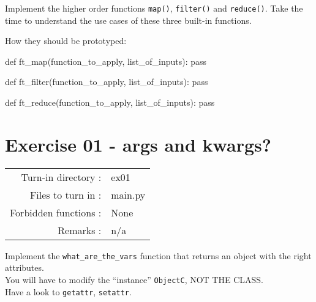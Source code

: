 \documentclass[]{article}
\newenvironment{Shaded}{\begin{snugshade}}{\end{snugshade}}
\newcommand{\ControlFlowTok}[1]{\textcolor[rgb]{0.99,0.74,0.29}{#1}}
\newcommand{\KeywordTok}[1]{\textcolor[rgb]{0.81,0.81,0.76}{#1}}
\newcommand{\NormalTok}[1]{\textcolor[rgb]{0.81,0.81,0.76}{#1}}
\begin{document}
Implement the higher order functions \texttt{map()}, \texttt{filter()}
and \texttt{reduce()}. Take the time to understand the use cases of
these three built-in functions.

How they should be prototyped:

\begin{Shaded}
\begin{Highlighting}[]
\KeywordTok{def}\NormalTok{ ft_map(function_to_apply, list_of_inputs):}
    \ControlFlowTok{pass}

\KeywordTok{def}\NormalTok{ ft_filter(function_to_apply, list_of_inputs):}
    \ControlFlowTok{pass}

\KeywordTok{def}\NormalTok{ ft_reduce(function_to_apply, list_of_inputs):}
    \ControlFlowTok{pass}
\end{Highlighting}
\end{Shaded}

\clearpage

\hypertarget{exercise-01---args-and-kwargs-1}{%
\section{Exercise 01 - args and
kwargs?}\label{exercise-01---args-and-kwargs-1}}

\begin{longtable}[]{@{}rl@{}}
\toprule
\endhead
Turn-in directory : & ex01\tabularnewline
Files to turn in : & main.py\tabularnewline
Forbidden functions : & None\tabularnewline
Remarks : & n/a\tabularnewline
\bottomrule
\end{longtable}

Implement the \texttt{what\_are\_the\_vars} function that returns an
object with the right attributes.\\
You will have to modify the ``instance'' \texttt{ObjectC}, NOT THE
CLASS.\\
Have a look to \texttt{getattr}, \texttt{setattr}.
\end{document}
